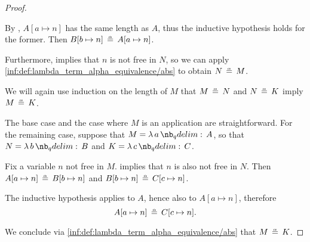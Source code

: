 \begin{proof}
\begin{itemize}
    By , \( A[a \mapsto n] \) has the same length as \( A \), thus the inductive hypothesis holds for the former. Then \( B[b \mapsto n] \aequiv A[a \mapsto n] \).

    Furthermore,  implies that \( n \) is not free in \( N \), so we can apply \ref{inf:def:lambda_term_alpha_equivalence/abs} to obtain \( N \aequiv M \).
  \end{itemize}

   We will again use induction on the length of \( M \) that \( M \aequiv N \) and \( N \aequiv K \) imply \( M \aequiv K \).

  The base case and the case where \( M \) is an application are straightforward. For the remaining case, suppose that \( M = \qabs a A \), so that \( N = \qabs b B \) and \( K = \qabs c C \).

  Fix a variable \( n \) not free in \( M \).  implies that \( n \) is also not free in \( N \). Then \( A[a \mapsto n] \aequiv B[b \mapsto n] \) and \( B[b \mapsto n] \aequiv C[c \mapsto n] \).

  The inductive hypothesis applies to \( A \), hence also to \( A[a \mapsto n] \), therefore
  \begin{equation*}
    A[a \mapsto n] \aequiv C[c \mapsto n].
  \end{equation*}

  We conclude via \ref{inf:def:lambda_term_alpha_equivalence/abs} that \( M \aequiv K \).
\end{proof}

